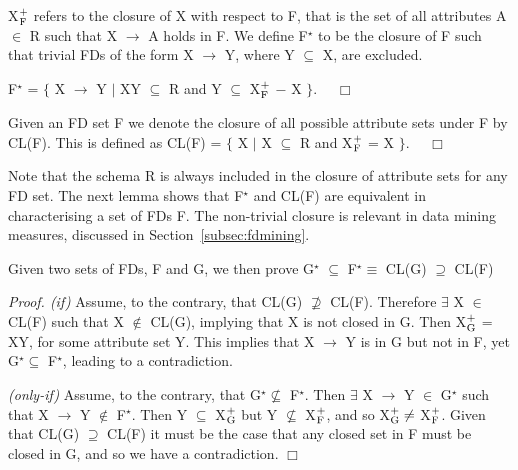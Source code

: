 X$_{\rm F}^+$ refers to the closure of X with respect to F, that is
the set of all attributes A $\in$ R such that X $\to$ A holds in F.
We define F$^\star$ to be the closure of F such that trivial
FDs of the form X $\to$ Y, where Y $\subseteq$ X, are excluded.

\begin{definition}
\begin{rm}
F$^\star$ = $\{$ X $\to$ Y $\mid$ XY $\subseteq$ R and Y $\subseteq$
X$_{\rm F}^+$ $-$  X $\}$. $\quad\Box$
\end{rm}
\end{definition}

\begin{definition}
\begin{rm}
Given an FD set F we denote the closure of all possible
attribute sets under F by CL(F). This is defined as
CL(F) = $\{$ X $\mid$ X $\subseteq$ R and X$_{\rm F}^+$ = X $\}$. $\quad\Box$
\end{rm}
\end{definition}

Note that the schema R is always included in the closure of attribute
sets for any FD set. The next lemma shows that F$^\star$ and 
CL(F) are equivalent in characterising a set of FDs F. The
non-trivial closure is relevant in data mining measures,
discussed in Section~\ref{subsec:fdmining}.

\begin{lemma}
\begin{rm}
Given two sets of FDs, F and G, we then prove 
G$^\star$ $\subseteq$ F$^\star \equiv$ CL(G) $\supseteq$ CL(F)
\end{rm}
\end{lemma}

{\em Proof. (if) }
Assume, to the contrary, that CL(G) $\not\supseteq$ CL(F).
Therefore $\exists$ X $\in$ CL(F) such that X $\not\in$ CL(G), implying
that X is not closed in G. 
Then X$_{\rm G}^+$ = XY, for some attribute set Y.
 This implies that X $\to$ Y is in G but
not in F, yet G$^\star \subseteq$ F$^\star$, leading to a
contradiction.

\smallskip
{\em (only-if)}
Assume, to the contrary, that G$^\star \not\subseteq$ F$^\star$. 
Then $\exists$ X $\to$ Y $\in$ G$^\star$ such that X $\to$ Y $\not\in$
F$^\star$. 
Then Y $\subseteq$ X$_{\rm G}^+$ but Y $\not\subseteq$ X$_{\rm F}^+$, 
and so X$^+_{\rm G} \not=$ X$^+_{\rm F}$.
Given that CL(G) $\supseteq$ CL(F) it must be the case that 
any closed set in F
must be closed in G, and so we have a contradiction. $\Box$

